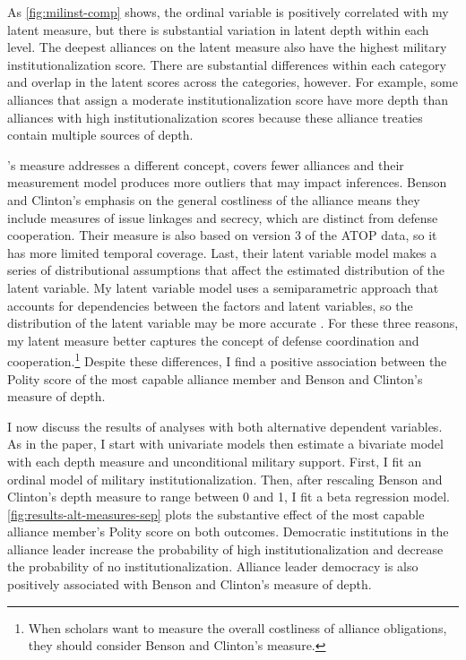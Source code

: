 \documentclass[12pt]{article}
\begin{document}
As \autoref{fig:milinst-comp} shows, the ordinal variable is positively correlated with my latent measure, but there is substantial variation in latent depth within each level. 
The deepest alliances on the latent measure also have the highest military institutionalization score.
There are substantial differences within each category and overlap in the latent scores across the categories, however. 
For example, some alliances that \citet{LeedsAnac2005} assign a moderate institutionalization score have more depth than alliances with high institutionalization scores because these alliance treaties contain multiple sources of depth. 


\citet{BensonClinton2016}'s measure addresses a different concept, covers fewer alliances and their measurement model produces more outliers that may impact inferences.
Benson and Clinton's emphasis on the general costliness of the alliance means they include measures of issue linkages and secrecy, which are distinct from defense cooperation. 
Their measure is also based on version 3 of the ATOP data, so it has more limited temporal coverage. 
Last, their latent variable model makes a series of distributional assumptions that affect the estimated distribution of the latent variable. 
My latent variable model uses a semiparametric approach that accounts for dependencies between the factors and latent variables, so the distribution of the latent variable may be more accurate \citep{Murrayetal2013}.
For these three reasons, my latent measure better captures the concept of defense coordination and cooperation.\footnote{When scholars want to measure the overall costliness of alliance obligations, they should consider Benson and Clinton's measure.} 
Despite these differences, I find a positive association between the Polity score of the most capable alliance member and Benson and Clinton's measure of depth. 


I now discuss the results of analyses with both alternative dependent variables. 
As in the paper, I start with univariate models then estimate a bivariate model with each depth measure and unconditional military support. 
First, I fit an ordinal model of military institutionalization. 
Then, after rescaling Benson and Clinton's depth measure to range between 0 and 1, I fit a beta regression model. 
\autoref{fig:results-alt-measures-sep} plots the substantive effect of the most capable alliance member's Polity score on both outcomes. 
Democratic institutions in the alliance leader increase the probability of high institutionalization and decrease the probability of no institutionalization. 
Alliance leader democracy is also positively associated with Benson and Clinton's measure of depth. 
\end{document}
